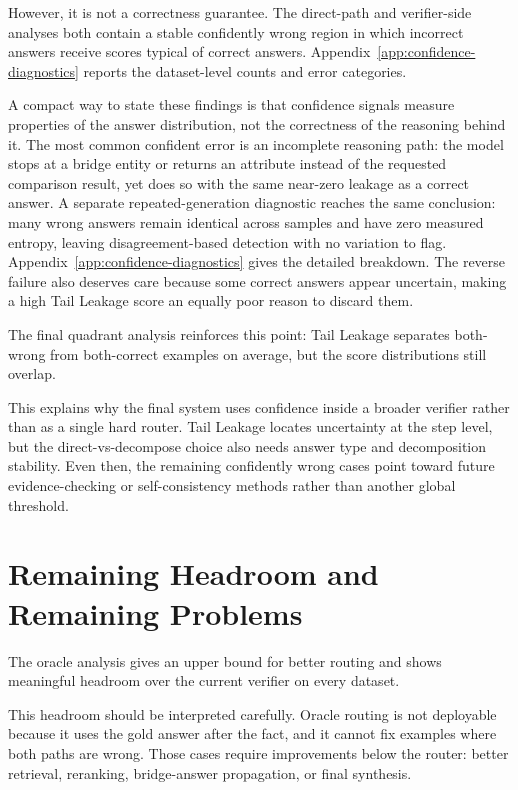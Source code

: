 However, it is not a correctness guarantee. The direct-path and verifier-side analyses both contain a stable confidently wrong region in which incorrect answers receive scores typical of correct answers. Appendix~\ref{app:confidence-diagnostics} reports the dataset-level counts and error categories.

A compact way to state these findings is that confidence signals measure properties of the answer distribution, not the correctness of the reasoning behind it. The most common confident error is an incomplete reasoning path: the model stops at a bridge entity or returns an attribute instead of the requested comparison result, yet does so with the same near-zero leakage as a correct answer. A separate repeated-generation diagnostic reaches the same conclusion: many wrong answers remain identical across samples and have zero measured entropy, leaving disagreement-based detection with no variation to flag. Appendix~\ref{app:confidence-diagnostics} gives the detailed breakdown. The reverse failure also deserves care because some correct answers appear uncertain, making a high Tail Leakage score an equally poor reason to discard them.

The final quadrant analysis reinforces this point: Tail Leakage separates both-wrong from both-correct examples on average, but the score distributions still overlap.

This explains why the final system uses confidence inside a broader verifier rather than as a single hard router. Tail Leakage locates uncertainty at the step level, but the direct-vs-decompose choice also needs answer type and decomposition stability. Even then, the remaining confidently wrong cases point toward future evidence-checking or self-consistency methods rather than another global threshold.

\section{Remaining Headroom and Remaining Problems}
\label{sec:remaining-headroom}

The oracle analysis gives an upper bound for better routing and shows meaningful headroom over the current verifier on every dataset.

This headroom should be interpreted carefully. Oracle routing is not deployable because it uses the gold answer after the fact, and it cannot fix examples where both paths are wrong. Those cases require improvements below the router: better retrieval, reranking, bridge-answer propagation, or final synthesis.

